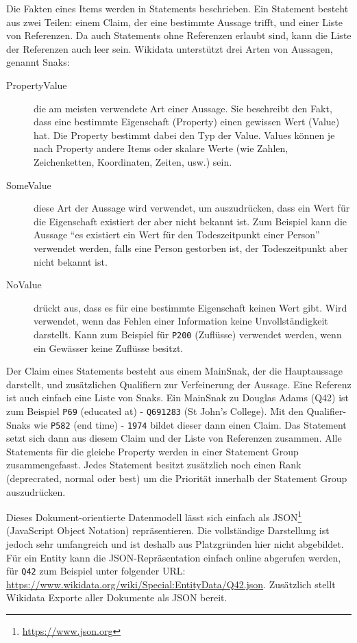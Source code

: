 Die Fakten eines Items werden in Statements beschrieben.
Ein Statement besteht aus zwei Teilen: einem Claim, der eine bestimmte Aussage trifft, und einer Liste von Referenzen.
Da auch Statements ohne Referenzen erlaubt sind, kann die Liste der Referenzen auch leer sein.
Wikidata unterstützt drei Arten von Aussagen, genannt Snaks:
\begin{description}
\item[PropertyValue] die am meisten verwendete Art einer Aussage. Sie beschreibt den Fakt, dass eine bestimmte Eigenschaft (Property) einen gewissen Wert (Value) hat. Die Property bestimmt dabei den Typ der Value. Values können je nach Property andere Items oder skalare Werte (wie Zahlen, Zeichenketten, Koordinaten, Zeiten, usw.) sein.
\item[SomeValue] diese Art der Aussage wird verwendet, um auszudrücken, dass ein Wert für die Eigenschaft existiert der aber nicht bekannt ist. Zum Beispiel kann die Aussage ``es existiert ein Wert für den Todeszeitpunkt einer Person'' verwendet werden, falls eine Person gestorben ist, der Todeszeitpunkt aber nicht bekannt ist.
\item[NoValue] drückt aus, dass es für eine bestimmte Eigenschaft keinen Wert gibt. Wird verwendet, wenn das Fehlen einer Information keine Unvollständigkeit darstellt. Kann zum Beispiel für \verb|P200| (Zuflüsse) verwendet werden, wenn ein Gewässer keine Zuflüsse besitzt. 
\end{description}
Der Claim eines Statements besteht aus einem MainSnak, der die Hauptaussage darstellt, und zusätzlichen Qualifiern zur Verfeinerung der Aussage.
Eine Referenz ist auch einfach eine Liste von Snaks. 
Ein MainSnak zu Douglas Adams (Q42) ist zum Beispiel \verb|P69| (educated at) - \verb|Q691283| (St John's College).
Mit den Qualifier-Snaks wie \verb|P582| (end time) - \verb|1974| bildet dieser dann einen Claim.
Das Statement setzt sich dann aus diesem Claim und der Liste von Referenzen zusammen.
Alle Statements für die gleiche Property werden in einer Statement Group zusammengefasst.
Jedes Statement besitzt zusätzlich noch einen Rank (deprecrated, normal oder best) um die Priorität innerhalb der Statement Group auszudrücken.

Dieses Dokument-orientierte Datenmodell lässt sich einfach als JSON\footnote{\url{https://www.json.org}} (JavaScript Object Notation) repräsentieren.
Die vollständige Darstellung ist jedoch sehr umfangreich und ist deshalb aus Platzgründen hier nicht abgebildet.
Für ein Entity kann die JSON-Repräsentation einfach online abgerufen werden, für \verb|Q42| zum Beispiel unter folgender URL: \url{https://www.wikidata.org/wiki/Special:EntityData/Q42.json}.
Zusätzlich stellt Wikidata Exporte aller Dokumente als JSON bereit.


